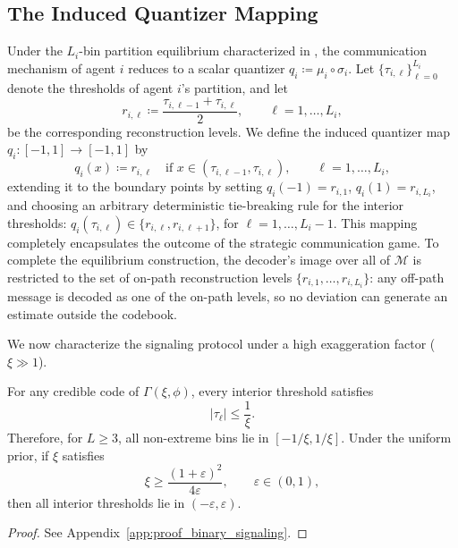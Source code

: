 \documentclass[journal,twoside,web]{ieeecolor}
\begin{document}
\subsection{The Induced Quantizer Mapping}
\label{subsec:induced_quantizer}
Under the $L_i$-bin partition equilibrium characterized in , the communication mechanism of agent $i$ reduces to a scalar quantizer $q_i \coloneqq \mu_i \circ \sigma_i$. Let $\{\tau_{i,\ell}\}_{\ell=0}^{L_i}$ denote the thresholds of agent $i$'s partition, and let
\[
    r_{i,\ell}\coloneqq \frac{\tau_{i,\ell-1}+\tau_{i,\ell}}{2},
    \qquad \ell=1,\dots,L_i,
\]
be the corresponding reconstruction levels. We define the induced quantizer map $q_i:[-1,1]\to[-1,1]$ by
\begin{equation}
    \label{eq:qi_def}
    q_i(x)\coloneqq r_{i,\ell}
    \quad \text{if } x\in(\tau_{i,\ell-1},\tau_{i,\ell}),
    \qquad \ell=1,\dots,L_i,
\end{equation}
extending it to the boundary points by setting $q_i(-1)=r_{i,1}$, $q_i(1)=r_{i,L_i}$, and choosing an arbitrary deterministic tie-breaking rule for the interior thresholds: $q_i(\tau_{i,\ell})\in\{r_{i,\ell},r_{i,\ell+1}\}$, for $\ell=1,\dots,L_i-1$.
This mapping completely encapsulates the outcome of the strategic communication game. To complete the equilibrium construction, the decoder's image over all of $\mathcal{M}$ is restricted to the set of on-path reconstruction levels $\{r_{i,1},\dots,r_{i,L_i}\}$: any off-path message is decoded as one of the on-path levels, so no deviation can generate an estimate outside the codebook.

We now characterize the signaling protocol under a high exaggeration factor ($\xi \gg 1$).

\begin{corollary}
    \label{cor:binary_signaling}
    For any credible code of $\Gamma(\xi,\phi)$, every interior threshold satisfies
    \[
        |\tau_\ell|\le \frac{1}{\xi}.
    \]
    Therefore, for $L\ge3$, all non-extreme bins lie in $[-1/\xi,1/\xi]$.
    Under the uniform prior, if $\xi$ satisfies
    \begin{equation}
        \label{eq:collapse_bound}
        \xi\ge \frac{(1+\varepsilon)^2}{4\varepsilon},
        \qquad \varepsilon\in(0,1),
    \end{equation}
    then all interior thresholds lie in $(-\varepsilon,\varepsilon)$.
\end{corollary}

\begin{proof}
    See Appendix~\ref{app:proof_binary_signaling}.

\end{proof}
\end{document}
